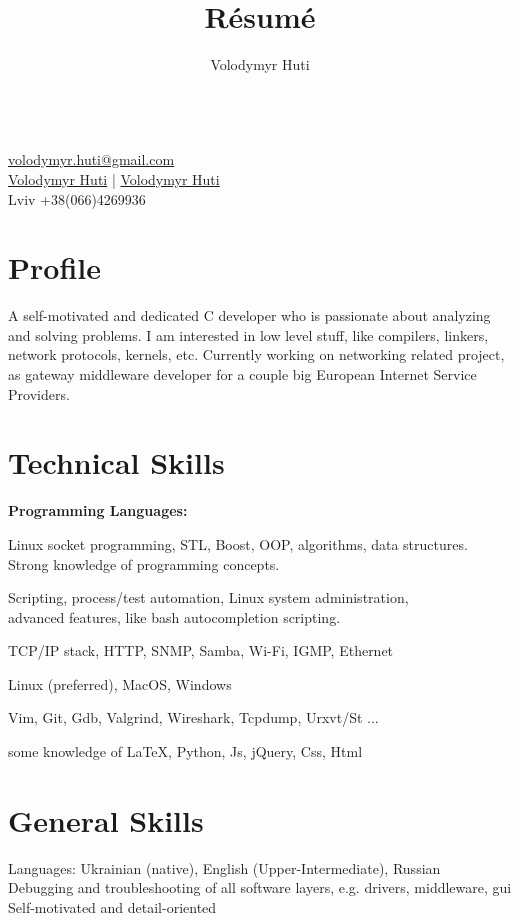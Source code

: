 \documentclass{article}
\author{Volodymyr Huti}
\title{R\'esum\'e}
\date{}
\makeatletter
\renewcommand{\maketitle}{
    \begin{center}
    {\huge\bfseries\theauthor}\\
    \vspace{.25em}
    \href{volodymyr.huti@gmail.com}{\faMailForward{} volodymyr.huti@gmail.com}\\
    \href{https://github.com/volodymyrhuti }{\faGithub{} Volodymyr Huti} |
    \href{https://www.linkedin.com/in/volodymyr-huti-b03a41156/}{\faLinkedinSquare{} Volodymyr Huti}\\
    Lviv +38(066)4269936 \\
    \end{center}
}
\makeatother
\begin{document}
\thispagestyle{empty}       %
\maketitle


\section{Profile}
A self-motivated and dedicated C developer who is passionate about analyzing and solving problems.
I am interested in low level stuff, like compilers, linkers, network protocols, kernels, etc.
Currently working on networking related project, as gateway middleware developer for a couple big
European Internet Service Providers.

\section{Technical Skills}
\textbf{Programming Languages:}
\begin{description}[align=left,leftmargin=3.8cm,style=multiline]
\item[C/C++] Linux socket programming, STL, Boost, OOP, algorithms, data structures.\\
             Strong knowledge of programming concepts.
\item[Shell] Scripting, process/test automation, Linux system administration,\\
             advanced features, like bash autocompletion scripting.\\
\item[Networking:] TCP/IP stack, HTTP, SNMP, Samba, Wi-Fi, IGMP, Ethernet
\item[Operating System:] Linux (preferred), MacOS, Windows
\item[Development Tools:] Vim, Git, Gdb, Valgrind, Wireshark, Tcpdump, Urxvt/St ...
\item[General:] some knowledge of \LaTeX, Python, Js, jQuery, Css, Html
\end{description}

\section{General Skills}
Languages: Ukrainian (native), English (Upper-Intermediate), Russian\\
Debugging and troubleshooting of all software layers, e.g. drivers, middleware, gui\\
Self-motivated and detail-oriented\\
\end{document}

